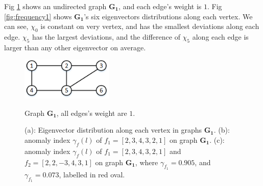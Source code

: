 \documentclass[conference]{IEEEtran}
\begin{document}
Fig \ref{fig:graph_G} shows an undirected graph $\mathbf{G_1}$, and each edge's weight is $1$. Fig \ref{fig:frequency1} shows  $\mathbf{G_1}$'s six eigenvectors distributions along each vertex. We can see, $\chi_0$ is constant on very vertex, and has the smallest deviations along each edge. $\chi_5$ has the largest deviations, and the difference of $\chi_5$ along each edge is larger than any other eigenvector on average.

\begin{figure}[h]
	\centering
    {
		\includegraphics[height=0.8in] {figures/graph_G.png}
	}
	\caption{Graph $\mathbf{G_1}$, all edges's weight are $1$.}
	\label{fig:graph_G}
\end{figure}


\begin{figure}[ht]
	\centering


	\caption{(a): Eigenvector distribution along each vertex in graphs $\mathbf{G_1}$.  (b): anomaly index $\gamma_f(l)$ of $f_1=[2,3,4,3,2,1]$ on graph $\mathbf{G_1}$. (c): anomaly index $\gamma_f(l)$ of $f_1=[2,3,4,3,2,1]$  and $f_2=[2,2,-3,4,3,1]$ on graph $\mathbf{G_1}$, where $\gamma_{f_1}=0.905$, and $\gamma_{f_1}=0.073$, labelled in red oval.}
	\label{fig:f_on_g2}
\end{figure}
\end{document}
